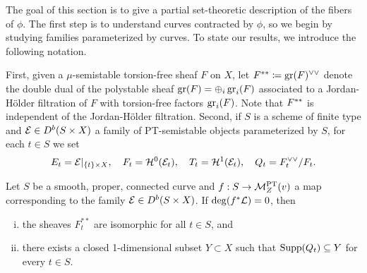 The goal of this section is to give a partial set-theoretic description of the fibers of $\phi$. The first step is to understand curves contracted by $\phi$, so we begin by studying families parameterized by curves. To state our results, we introduce the following notation. 

First, given a $\mu$-semistable torsion-free sheaf $F$ on $X$, let $F^{\ast\ast} \coloneqq \operatorname{\mathrm{gr}}(F)^{\vee\vee}$ denote the double dual of the polystable sheaf $\operatorname{\mathrm{gr}}(F) = \oplus_i \operatorname{\mathrm{gr}}_i(F)$ associated to a Jordan-H\"older filtration of $F$ with torsion-free factors $\operatorname{\mathrm{gr}}_i(F)$. Note that $F^{\ast\ast}$ is independent of the Jordan-H\"older filtration. Second, if $S$ is a scheme of finite type and $\mathcal{E} \in D^b(S \times X)$ a family of PT-semistable objects parameterized by $S$, for each $t \in S$ we set 
\[ E_t = \mathcal{E}|_{\{t\} \times X}, \quad F_t = \mathcal{H}^0(\mathcal{E}_t), \quad T_t = \mathcal{H}^1(\mathcal{E}_t), \quad Q_t = F_t^{\vee\vee}/F_t. \]

\begin{prop}\label{dd-S-equiv-Z}
Let $S$ be a smooth, proper, connected curve and $f: S \to \mathcal{M}^{\text{PT}}_Z(v)$ a map corresponding to the family $\mathcal{E} \in D^b(S \times X)$. If $\deg(f^*\mathcal{L}) = 0$, then 
\begin{enumerate}[(i)]
    \item the sheaves $F_t^{\ast\ast}$ are isomorphic for all $t \in S$, and
    \item there exists a closed 1-dimensional subset $Y \subset X$ such that $\operatorname{\mathrm{Supp}}(Q_t) \subseteq Y$ for every $t \in S$.
\end{enumerate}
\end{prop}

